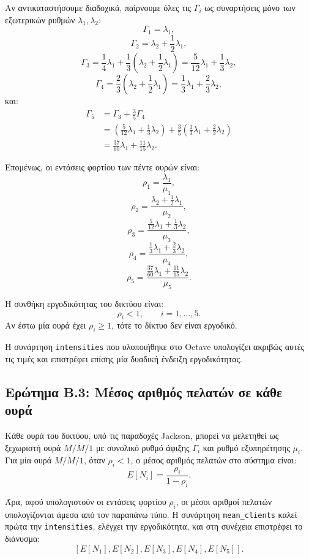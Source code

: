 \documentclass{article}
\begin{document}
Αν αντικαταστήσουμε διαδοχικά, παίρνουμε όλες τις $\Gamma_i$ ως συναρτήσεις μόνο των εξωτερικών ρυθμών $\lambda_1,\lambda_2$:
\[
    \Gamma_1 = \lambda_1,
\]
\[
    \Gamma_2 = \lambda_2 + \frac{1}{2}\lambda_1,
\]
\[
    \Gamma_3 =
    \frac{1}{4}\lambda_1
    +
    \frac{1}{3}\left(\lambda_2+\frac{1}{2}\lambda_1\right)
    =
    \frac{5}{12}\lambda_1 + \frac{1}{3}\lambda_2,
\]
\[
    \Gamma_4 =
    \frac{2}{3}\left(\lambda_2+\frac{1}{2}\lambda_1\right)
    =
    \frac{1}{3}\lambda_1 + \frac{2}{3}\lambda_2,
\]
και:
\[
\begin{aligned}
    \Gamma_5
    &=
    \Gamma_3 + \frac{3}{5}\Gamma_4 \\
    &=
    \left(\frac{5}{12}\lambda_1+\frac{1}{3}\lambda_2\right)
    +
    \frac{3}{5}\left(\frac{1}{3}\lambda_1+\frac{2}{3}\lambda_2\right) \\
    &=
    \frac{37}{60}\lambda_1 + \frac{11}{15}\lambda_2.
\end{aligned}
\]

Επομένως, οι εντάσεις φορτίου των πέντε ουρών είναι:
\[
    \rho_1 = \frac{\lambda_1}{\mu_1},
\]
\[
    \rho_2 =
    \frac{\lambda_2+\frac{1}{2}\lambda_1}{\mu_2},
\]
\[
    \rho_3 =
    \frac{\frac{5}{12}\lambda_1+\frac{1}{3}\lambda_2}{\mu_3},
\]
\[
    \rho_4 =
    \frac{\frac{1}{3}\lambda_1+\frac{2}{3}\lambda_2}{\mu_4},
\]
\[
    \rho_5 =
    \frac{\frac{37}{60}\lambda_1+\frac{11}{15}\lambda_2}{\mu_5}.
\]

Η συνθήκη εργοδικότητας του δικτύου είναι:
\[
    \rho_i < 1,
    \qquad i=1,\ldots,5.
\]
Αν έστω μία ουρά έχει $\rho_i \geq 1$, τότε το δίκτυο δεν είναι εργοδικό.

Η συνάρτηση \texttt{intensities} που υλοποιήθηκε στο Octave υπολογίζει ακριβώς αυτές τις τιμές και επιστρέφει επίσης μία δυαδική ένδειξη εργοδικότητας.

\subsection{Ερώτημα Β.3: Μέσος αριθμός πελατών σε κάθε ουρά}

Κάθε ουρά του δικτύου, υπό τις παραδοχές Jackson, μπορεί να μελετηθεί ως ξεχωριστή ουρά $M/M/1$ με συνολικό ρυθμό άφιξης $\Gamma_i$ και ρυθμό εξυπηρέτησης $\mu_i$. Για μία ουρά $M/M/1$, όταν $\rho_i<1$, ο μέσος αριθμός πελατών στο σύστημα είναι:
\[
    E[N_i] = \frac{\rho_i}{1-\rho_i}.
\]

Άρα, αφού υπολογιστούν οι εντάσεις φορτίου $\rho_i$, οι μέσοι αριθμοί πελατών υπολογίζονται άμεσα από τον παραπάνω τύπο. Η συνάρτηση \texttt{mean\_clients} καλεί πρώτα την \texttt{intensities}, ελέγχει την εργοδικότητα, και στη συνέχεια επιστρέφει το διάνυσμα:
\[
    [E[N_1],E[N_2],E[N_3],E[N_4],E[N_5]].
\]
\end{document}
